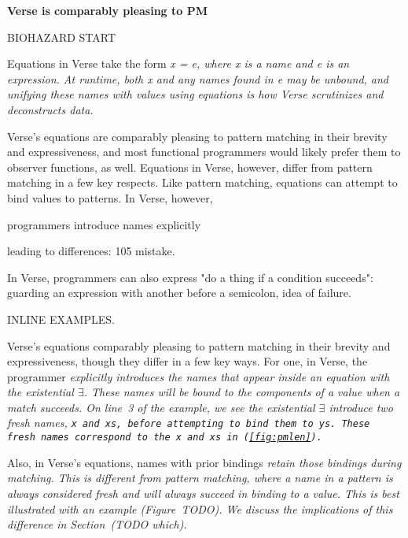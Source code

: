 \documentclass[manuscript,screen,review, 12pt]{acmart}
\begin{document}
\begin{outline}[enumerate]
    \1 \bf{\bf{Verse is comparably pleasing to PM }} 
    



    BIOHAZARD START 

    Equations in Verse take the form \it{x = e}, where \it{x} is a name and
    \it{e} is an expression. At runtime, both \it{x} and any names found in
    \it{e} may be unbound, and unifying these names with values using equations
    is how Verse scrutinizes and deconstructs data. 
    
    Verse's equations are comparably pleasing to pattern matching in their
    brevity and expressiveness, and most functional programmers would likely
    prefer them to observer functions, as well. Equations in Verse, however,
    differ from pattern matching in a few key respects. Like pattern matching,
    equations can attempt to bind values to patterns. In Verse, however, 

    programmers introduce names explicitly 

    leading to differences: 
    105 mistake. 

    In Verse, programmers can also express "do a thing if a condition succeeds":
    guarding an expression with another before a semicolon, 
    idea of failure. 

    INLINE EXAMPLES. 

    Verse's equations comparably pleasing to pattern matching in their brevity
    and expressiveness, though they differ in a few key ways. For one, in Verse,
    the programmer \it{explicitly} introduces the names that appear inside an
    equation with the existential $\exists$. These names will be bound to the
    components of a value when a match succeeds. On line~3 of the example, we
    see the existential $\exists$ introduce two fresh names, \tt{x} and \tt{xs},
    before attempting to bind them to \tt{ys}. These fresh names correspond to
    the \tt{x} and \tt{xs} in (\cref{fig:pmlen}). 

    Also, in Verse's equations, names with prior bindings \it{retain those
    bindings} during matching. This is different from pattern matching, where a
    name in a pattern is always considered fresh and will always succeed in
    binding to a value. This is best illustrated with an example (Figure~TODO). 
    We discuss the implications of this difference in Section~(TODO which).




\end{outline}
\end{document}
